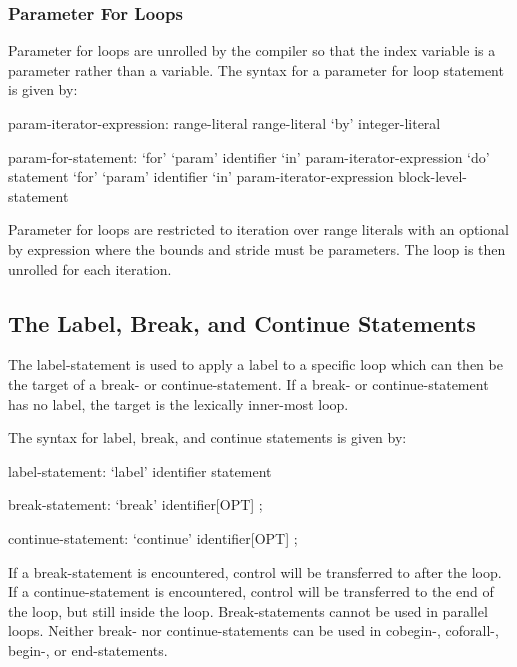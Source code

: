 \subsubsection{Parameter For Loops}
\label{Parameter_For_Loops}


Parameter for loops are unrolled by the compiler so that the index
variable is a parameter rather than a variable.  The syntax for a
parameter for loop statement is given by:
\begin{syntax}
param-iterator-expression:
  range-literal
  range-literal `by' integer-literal

param-for-statement:
  `for' `param' identifier `in' param-iterator-expression `do' statement
  `for' `param' identifier `in' param-iterator-expression block-level-statement
\end{syntax}
Parameter for loops are restricted to iteration over range literals
with an optional by expression where the bounds and stride must be
parameters.  The loop is then unrolled for each iteration.

\subsection{The Label, Break, and Continue Statements}
\label{Label_Break_Continue}

The label-statement is used to apply a label to a specific loop which
can then be the target of a break- or continue-statement.  If a break-
or continue-statement has no label, the target is the lexically
inner-most loop.

The syntax for label, break, and continue statements is given by:
\begin{syntax}
label-statement:
  `label' identifier statement

break-statement:
  `break' identifier[OPT] ;

continue-statement:
  `continue' identifier[OPT] ;
\end{syntax}

If a break-statement is encountered, control will be transferred to
after the loop.  If a continue-statement is encountered, control will
be transferred to the end of the loop, but still inside the loop.
Break-statements cannot be used in parallel loops.  Neither break- nor
continue-statements can be used in cobegin-, coforall-, begin-, or
end-statements.

